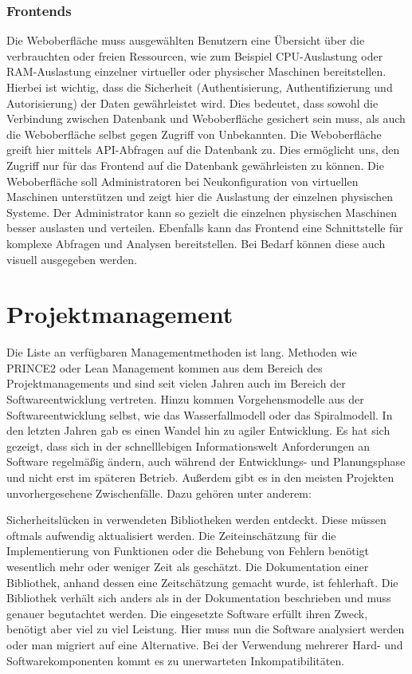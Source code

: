 \subsection{Frontends}
Die Weboberfläche muss ausgewählten Benutzern eine Übersicht über die
verbrauchten oder freien Ressourcen, wie zum Beispiel CPU-Auslastung oder
RAM-Auslastung einzelner virtueller oder physischer Maschinen bereitstellen.
Hierbei ist wichtig, dass die Sicherheit (Authentisierung, Authentifizierung
und Autorisierung) der Daten gewährleistet wird. Dies bedeutet, dass sowohl die
Verbindung zwischen Datenbank und Weboberfläche gesichert sein muss, als auch
die Weboberfläche selbst gegen Zugriff von Unbekannten. Die Weboberfläche
greift hier mittels API-Abfragen auf die Datenbank zu. Dies ermöglicht uns, den
Zugriff nur für das Frontend auf die Datenbank gewährleisten zu können. Die
Weboberfläche soll Administratoren bei Neukonfiguration von virtuellen
Maschinen unterstützen und zeigt hier die Auslastung der einzelnen physischen
Systeme. Der Administrator kann so gezielt die einzelnen physischen Maschinen
besser auslasten und verteilen. Ebenfalls kann das Frontend eine Schnittstelle
für komplexe Abfragen und Analysen bereitstellen. Bei Bedarf können diese auch
visuell ausgegeben werden.
\mr%

\chapter{Projektmanagement}
Die Liste an verfügbaren Managementmethoden ist lang. Methoden wie PRINCE2 oder
Lean Management kommen aus dem Bereich des Projektmanagements und sind seit
vielen Jahren auch im Bereich der Softwareentwicklung vertreten. Hinzu kommen
Vorgehensmodelle aus der Softwareentwicklung selbst, wie das Wasserfallmodell
oder das Spiralmodell. In den letzten Jahren gab es einen Wandel hin zu agiler
Entwicklung. Es hat sich gezeigt, dass sich in der schnelllebigen
Informationswelt Anforderungen an Software regelmäßig ändern, auch während der
Entwicklungs- und Planungsphase und nicht erst im späteren Betrieb. Außerdem
gibt es in den meisten Projekten unvorhergesehene Zwischenfälle. Dazu gehören
unter anderem:

\begin{outline}
  \1 Sicherheitslücken in verwendeten Bibliotheken werden entdeckt. Diese
  müssen oftmals aufwendig aktualisiert werden.
  \1 Die Zeiteinschätzung für die Implementierung von Funktionen oder die
  Behebung von Fehlern benötigt wesentlich mehr oder weniger Zeit als
  geschätzt.
  \1 Die Dokumentation einer Bibliothek, anhand dessen eine Zeitschätzung
  gemacht wurde, ist fehlerhaft. Die Bibliothek verhält sich anders als in der
  Dokumentation beschrieben und muss genauer begutachtet werden.
  \1 Die eingesetzte Software erfüllt ihren Zweck, benötigt aber viel zu viel
  Leistung. Hier muss nun die Software analysiert werden oder man migriert auf
  eine Alternative.
  \1 Bei der Verwendung mehrerer Hard- und Softwarekomponenten kommt es zu
  unerwarteten Inkompatibilitäten.
\end{outline}

